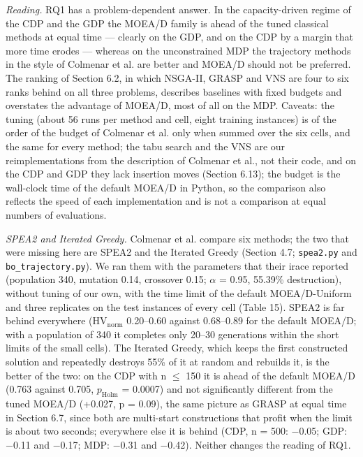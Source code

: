 \emph{Reading.} RQ1 has a problem-dependent answer. In the capacity-driven regime of the CDP and the GDP the MOEA/D family is ahead of the tuned classical methods at equal time --- clearly on the GDP, and on the CDP by a margin that more time erodes --- whereas on the unconstrained MDP the trajectory methods in the style of Colmenar et al. are better and MOEA/D should not be preferred. The ranking of Section 6.2, in which NSGA-II, GRASP and VNS are four to six ranks behind on all three problems, describes baselines with fixed budgets and overstates the advantage of MOEA/D, most of all on the MDP. Caveats: the tuning (about 56 runs per method and cell, eight training instances) is of the order of the budget of Colmenar et al. only when summed over the six cells, and the same for every method; the tabu search and the VNS are our reimplementations from the description of Colmenar et al., not their code, and on the CDP and GDP they lack insertion moves (Section 6.13); the budget is the wall-clock time of the default MOEA/D in Python, so the comparison also reflects the speed of each implementation and is not a comparison at equal numbers of evaluations.

\emph{SPEA2 and Iterated Greedy.} Colmenar et al. compare six methods; the two that were missing here are SPEA2 and the Iterated Greedy (Section 4.7; \texttt{spea2.py} and \texttt{bo\_\allowbreak{}trajectory.py}). We ran them with the parameters that their irace reported (population 340, mutation 0.14, crossover 0.15; $\alpha$ = 0.95, 55.39\% destruction), without tuning of our own, with the time limit of the default MOEA/D-Uniform and three replicates on the test instances of every cell (Table 15). SPEA2 is far behind everywhere ($\mathrm{HV}_{\mathrm{norm}}$ 0.20--0.60 against 0.68--0.89 for the default MOEA/D; with a population of 340 it completes only 20--30 generations within the short limits of the small cells). The Iterated Greedy, which keeps the first constructed solution and repeatedly destroys 55\% of it at random and rebuilds it, is the better of the two: on the CDP with n $\leq$ 150 it is ahead of the default MOEA/D (0.763 against 0.705, $p_{\mathrm{Holm}}$ = 0.0007) and not significantly different from the tuned MOEA/D (+0.027, p = 0.09), the same picture as GRASP at equal time in Section 6.7, since both are multi-start constructions that profit when the limit is about two seconds; everywhere else it is behind (CDP, n = 500: $-$0.05; GDP: $-$0.11 and $-$0.17; MDP: $-$0.31 and $-$0.42). Neither changes the reading of RQ1.

